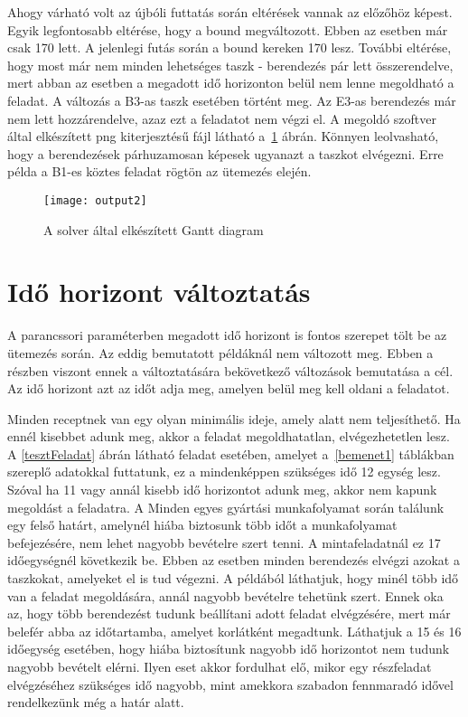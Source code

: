 Ahogy várható volt az újbóli futtatás során eltérések vannak az előzőhöz képest. Egyik legfontosabb eltérése, hogy a bound megváltozott. Ebben az esetben már csak 170 lett. A jelenlegi futás során a bound kereken 170 lesz. További eltérése, hogy most már nem minden lehetséges taszk - berendezés pár lett összerendelve, mert abban az esetben a megadott idő horizonton belül nem lenne megoldható a feladat. A változás a B3-as taszk esetében történt meg. Az E3-as berendezés már nem lett hozzárendelve, azaz ezt a feladatot nem végzi el. A megoldó szoftver által elkészített png kiterjesztésű fájl látható a~\ref{output2} ábrán. Könnyen leolvasható, hogy a berendezések párhuzamosan képesek ugyanazt a taszkot elvégezni. Erre példa a B1-es köztes feladat rögtön az ütemezés elején. 

\begin{figure}[H]
\begin{center}
\texttt{[image: output2]}
\caption{A solver által elkészített Gantt diagram}
\label{output2}
\end{center}
\end{figure}

\section{Idő horizont változtatás}
A parancssori paraméterben megadott idő horizont is fontos szerepet tölt be az ütemezés során. Az eddig bemutatott példáknál nem változott meg. Ebben a részben viszont ennek a változtatására bekövetkező változások bemutatása a cél. Az idő horizont azt az időt adja meg, amelyen belül meg kell oldani a feladatot.

Minden receptnek van egy olyan minimális ideje, amely alatt nem teljesíthető. Ha ennél kisebbet adunk meg, akkor a feladat megoldhatatlan, elvégezhetetlen lesz. A \ref{tesztFeladat} ábrán látható feladat esetében, amelyet a~\ref{bemenet1} táblákban szereplő adatokkal futtatunk, ez a mindenképpen szükséges idő 12 egység lesz. Szóval ha 11 vagy annál kisebb idő horizontot adunk meg, akkor nem kapunk megoldást a feladatra. A Minden egyes gyártási munkafolyamat során találunk egy felső határt, amelynél hiába biztosunk több időt a munkafolyamat befejezésére, nem lehet nagyobb bevételre szert tenni. A mintafeladatnál ez 17 időegységnél következik be. Ebben az esetben minden berendezés elvégzi azokat a taszkokat, amelyeket el is tud végezni. A példából láthatjuk, hogy minél több idő van a feladat megoldására, annál nagyobb bevételre tehetünk szert. Ennek oka az, hogy több berendezést tudunk beállítani adott feladat elvégzésére, mert már belefér abba az időtartamba, amelyet korlátként megadtunk. Láthatjuk a 15 és 16 időegység esetében, hogy hiába biztosítunk nagyobb idő horizontot nem tudunk nagyobb bevételt elérni. Ilyen eset akkor fordulhat elő, mikor egy részfeladat elvégzéséhez szükséges idő nagyobb, mint amekkora szabadon fennmaradó idővel rendelkezünk még a határ alatt.  

